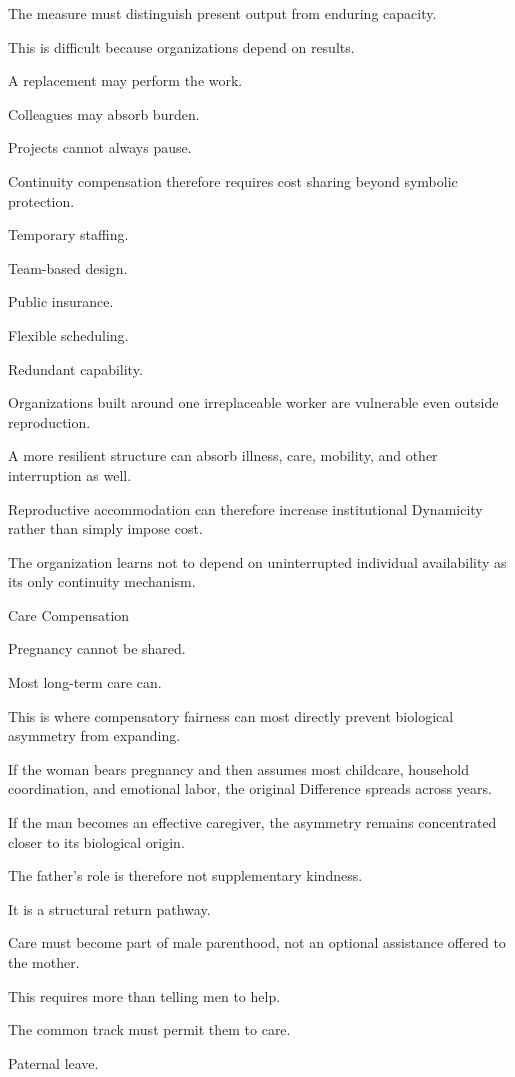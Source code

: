 The measure must distinguish present output from enduring capacity.

This is difficult because organizations depend on results.

A replacement may perform the work.

Colleagues may absorb burden.

Projects cannot always pause.

Continuity compensation therefore requires cost sharing beyond symbolic protection.

Temporary staffing.

Team-based design.

Public insurance.

Flexible scheduling.

Redundant capability.

Organizations built around one irreplaceable worker are vulnerable even outside reproduction.

A more resilient structure can absorb illness, care, mobility, and other interruption as well.

Reproductive accommodation can therefore increase institutional Dynamicity rather than simply impose cost.

The organization learns not to depend on uninterrupted individual availability as its only continuity mechanism.

Care Compensation

Pregnancy cannot be shared.

Most long-term care can.

This is where compensatory fairness can most directly prevent biological asymmetry from expanding.

If the woman bears pregnancy and then assumes most childcare, household coordination, and emotional labor, the original Difference spreads across years.

If the man becomes an effective caregiver, the asymmetry remains concentrated closer to its biological origin.

The father’s role is therefore not supplementary kindness.

It is a structural return pathway.

Care must become part of male parenthood, not an optional assistance offered to the mother.

This requires more than telling men to help.

The common track must permit them to care.

Paternal leave.

